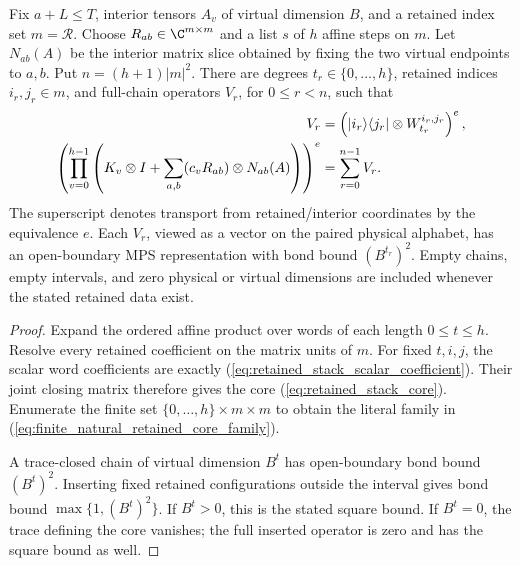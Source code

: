 \begin{lemma}
    \label{thm:finite_natural_retained_core_family}
    \leanok
    Fix $a+L\le T$, interior tensors $A_v$ of virtual dimension $B$, and
    a retained index set $m=\mathcal R$. Choose $R_{ab}\in\C^{m\times m}$
    and a list $s$ of $h$ affine steps on $m$.
    Let $N_{ab}(A)$ be the interior matrix slice obtained by fixing the two
    virtual endpoints to $a,b$. Put $n=(h+1)|m|^2$.
    There are degrees $t_r\in\{0,\ldots,h\}$, retained indices $i_r,j_r\in m$,
    and full-chain operators $V_r$, for $0\le r<n$, such that
    \begin{align}
        V_r & =\left(|i_r\rangle\langle j_r|\otimes
        W_{t_r}^{i_r,j_r}\right)^e,\notag           \\
        \left(\prod_{v=0}^{h-1}\left(K_v\otimes I+
        \sum_{a,b}(c_vR_{ab})\otimes N_{ab}(A)\right)\right)^e
            & =\sum_{r=0}^{n-1}V_r.
        \label{eq:finite_natural_retained_core_family}
    \end{align}
    The superscript denotes transport from retained/interior coordinates by
    the equivalence $e$. Each $V_r$, viewed as a vector on the paired physical
    alphabet, has an open-boundary MPS representation with bond bound
    $(B^{t_r})^2$. Empty chains, empty intervals, and zero physical or virtual
    dimensions are included whenever the stated retained data exist.
\end{lemma}
\begin{proof}\leanok
    Expand the ordered affine product over words of each length $0\le t\le h$.
    Resolve every retained coefficient on the matrix units of $m$. For fixed
    $t,i,j$, the scalar word coefficients are exactly
    (\ref{eq:retained_stack_scalar_coefficient}). Their joint closing matrix
    therefore gives the core (\ref{eq:retained_stack_core}). Enumerate the
    finite set $\{0,\ldots,h\}\times m\times m$ to obtain the literal family
    in (\ref{eq:finite_natural_retained_core_family}).

    A trace-closed chain of virtual dimension $B^t$ has open-boundary bond
    bound $(B^t)^2$. Inserting fixed retained configurations outside the
    interval gives bond bound $\max\{1,(B^t)^2\}$. If $B^t>0$, this is the
    stated square bound. If $B^t=0$, the trace defining the core vanishes;
    the full inserted operator is zero and has the square bound as well.
\end{proof}

